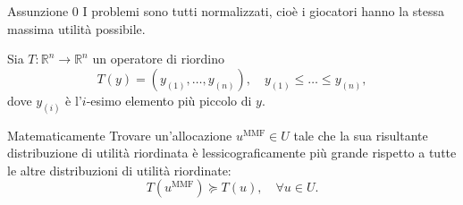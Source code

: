 \documentclass{beamer}
\begin{document}
\begin{frame}
	\begin{block}{Assunzione 0}
		I problemi sono tutti normalizzati, cioè i giocatori hanno la stessa massima utilità possibile.
	\end{block}
%
	Sia $T: \mathbb{R}^n \rightarrow \mathbb{R}^n$ un operatore di riordino
	\begin{equation*}
		T(y) = (y_{(1)}, \dots, y_{(n)}), \quad y_{(1)} \le \dots \le y_{(n)},
	\end{equation*}
	dove $y_{(i)}$ è l'$i$-esimo elemento più piccolo di $y$. 
	\begin{block}{Matematicamente}
		Trovare un'allocazione $u^{\text{MMF}} \in U$ tale che la sua risultante distribuzione di utilità riordinata è lessicograficamente più grande rispetto a tutte le altre distribuzioni di utilità riordinate:
		\vspace{-0.4cm}
		\begin{equation}
			T(u^{\text{MMF}}) \succeq T(u), \quad \forall u \in U.
		\end{equation}
		\vspace{-0.5cm}
	\end{block}
\end{frame}
\end{document}

